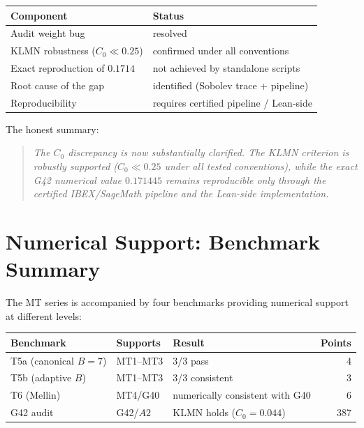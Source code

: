 \documentclass[11pt,a4paper]{article}
\begin{document}
\begin{center}
\begin{tabular}{@{}ll@{}}
\toprule
\textbf{Component} & \textbf{Status} \\
\midrule
Audit weight bug & resolved \\
KLMN robustness ($C_0\ll 0.25$) & confirmed under all conventions \\
Exact reproduction of $0.1714$ & not achieved by standalone scripts \\
Root cause of the gap & identified (Sobolev trace + pipeline) \\
Reproducibility & requires certified pipeline / Lean-side \\
\bottomrule
\end{tabular}
\end{center}

The honest summary:

\begin{quote}
\emph{The $C_0$ discrepancy is now substantially clarified.  The KLMN criterion is robustly supported ($C_0\ll 0.25$ under all tested conventions), while the exact G42 numerical value $0.171445$ remains reproducible only through the certified IBEX/SageMath pipeline and the Lean-side implementation.}
\end{quote}

\section{Numerical Support: Benchmark Summary}

The MT series is accompanied by four benchmarks providing numerical support at different levels:

\begin{center}
\begin{tabular}{@{}lllr@{}}
\toprule
\textbf{Benchmark} & \textbf{Supports} & \textbf{Result} & \textbf{Points} \\
\midrule
T5a (canonical $B\!=\!7$) & MT1--MT3 & 3/3 pass & 4 \\
T5b (adaptive $B$) & MT1--MT3 & 3/3 consistent & 3 \\
T6 (Mellin) & MT4/G40 & numerically consistent with G40 & 6 \\
G42 audit & G42/$A2$ & KLMN holds ($C_0\!=\!0.044$) & 387 \\
\bottomrule
\end{tabular}
\end{center}
\end{document}
